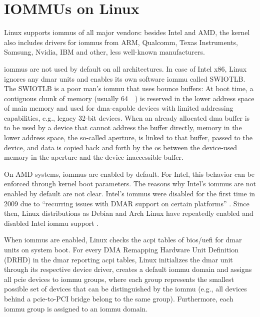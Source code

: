 \section{IOMMUs on Linux}
\label{sec:iommus_on_linux}

Linux supports \acp{iommu} of all major vendors: besides Intel and AMD, the
kernel also includes drivers for \acp{iommu} from ARM, Qualcomm, Texas
Instruments, Samsung, Nvidia, IBM and other, less well-known manufacturers.

\acp{iommu} are not used by default on all architectures. In case of Intel x86,
Linux ignores any \ac{dmar} units and enables its own software \ac{iommu} called
SWIOTLB. The SWIOTLB is a poor man's \ac{iommu} that uses bounce buffers: At
boot time, a contiguous chunk of memory (usually \SI{64}{\mebi\byte}) is
reserved in the lower address space of main memory and used for \ac{dma}-capable
devices with limited addressing capabilities, e.g., legacy 32-bit devices. When
an already allocated \ac{dma} buffer is to be used by a device that cannot
address the buffer directly, memory in the lower address space, the so-called
aperture, is linked to that buffer, passed to the device, and data is copied
back and forth by the \ac{os} between the device-used memory in the aperture and
the device-inaccessible buffer.

On AMD systems, \acp{iommu} are enabled by default. For Intel, this behavior can
be enforced through kernel boot parameters. The reasons why Intel's \acp{iommu}
are not enabled by default are not clear. Intel's \acp{iommu} were disabled
for the first time in 2009 due to ``recurring issues with DMAR support on
certain platforms'' \cite{mcmartin2009disable}. Since then, Linux distributions
as Debian and Arch Linux have repeatedly enabled and disabled Intel \ac{iommu}
support \cite{heftig2020disable, hutchings2009enable}.

When \acp{iommu} are enabled, Linux checks the \acs{acpi} tables of
\ac{bios}/\ac{uefi} for \ac{dmar} units on system boot. For every DMA Remapping
Hardware Unit Definition (DRHD) in the \ac{dmar} reporting \ac{acpi} tables,
Linux initializes the \ac{dmar} unit through its respective device driver,
creates a default \ac{iommu} domain and assigns all \ac{pcie} devices to
\ac{iommu} groups, where each group represents the smallest possible set of
devices that can be distinguished by the \ac{iommu} (e.g., all devices behind a
\ac{pcie}-to-PCI bridge belong to the same group). Furthermore, each \ac{iommu}
group is assigned to an \ac{iommu} domain.

